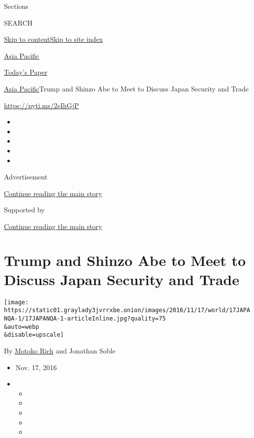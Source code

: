 Sections

SEARCH

\protect\hyperlink{site-content}{Skip to
content}\protect\hyperlink{site-index}{Skip to site index}

\href{https://www.nytimes3xbfgragh.onion/section/world/asia}{Asia
Pacific}

\href{https://myaccount.nytimes3xbfgragh.onion/auth/login?response_type=cookie\&client_id=vi}{}

\href{https://www.nytimes3xbfgragh.onion/section/todayspaper}{Today's
Paper}

\href{/section/world/asia}{Asia Pacific}\textbar{}Trump and Shinzo Abe
to Meet to Discuss Japan Security and Trade

\url{https://nyti.ms/2eIhGjP}

\begin{itemize}
\item
\item
\item
\item
\item
\end{itemize}

Advertisement

\protect\hyperlink{after-top}{Continue reading the main story}

Supported by

\protect\hyperlink{after-sponsor}{Continue reading the main story}

\hypertarget{trump-and-shinzo-abe-to-meet-to-discuss-japan-security-and-trade}{%
\section{Trump and Shinzo Abe to Meet to Discuss Japan Security and
Trade}\label{trump-and-shinzo-abe-to-meet-to-discuss-japan-security-and-trade}}

\texttt{[image: https://static01.graylady3jvrrxbe.onion/images/2016/11/17/world/17JAPANQA-1/17JAPANQA-1-articleInline.jpg?quality=75\\\&auto=webp\\\&disable=upscale]}

By \href{http://www.nytimes3xbfgragh.onion/by/motoko-rich}{Motoko Rich}
and Jonathan Soble

\begin{itemize}
\item
  Nov. 17, 2016
\item
  \begin{itemize}
  \item
  \item
  \item
  \item
  \item
  \end{itemize}
\end{itemize}

